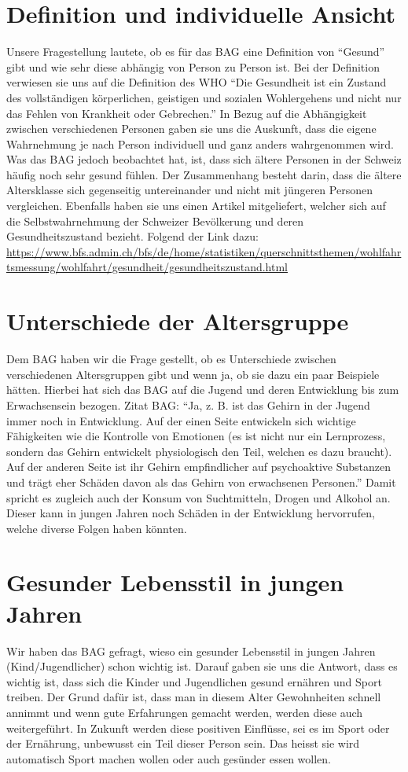 \section{Definition und individuelle Ansicht}
Unsere Fragestellung lautete, ob es für das BAG eine Definition von “Gesund” gibt und wie sehr diese abhängig von Person zu Person ist. Bei der Definition verwiesen sie uns auf die Definition des WHO “Die Gesundheit ist ein Zustand des vollständigen körperlichen, geistigen und sozialen Wohlergehens und nicht nur das Fehlen von Krankheit oder Gebrechen.” \cite{gesundheit_definition}
In Bezug auf die Abhängigkeit zwischen verschiedenen Personen gaben sie uns die Auskunft, dass die eigene Wahrnehmung je nach Person individuell und ganz anders wahrgenommen wird. Was das BAG jedoch beobachtet hat, ist, dass sich ältere Personen in der Schweiz häufig noch sehr gesund fühlen. Der Zusammenhang besteht darin, dass die ältere Altersklasse sich gegenseitig untereinander und nicht mit jüngeren Personen vergleichen. Ebenfalls haben sie uns einen Artikel mitgeliefert, welcher sich auf die Selbstwahrnehmung der Schweizer Bevölkerung und deren Gesundheitszustand bezieht. Folgend der Link dazu:
\newline
\url{https://www.bfs.admin.ch/bfs/de/home/statistiken/querschnittsthemen/wohlfahrtsmessung/wohlfahrt/gesundheit/gesundheitszustand.html}
\section{Unterschiede der Altersgruppe}
Dem BAG haben wir die Frage gestellt, ob es Unterschiede zwischen verschiedenen Altersgruppen gibt und wenn ja, ob sie dazu ein paar Beispiele hätten. Hierbei hat sich das BAG auf die Jugend und deren Entwicklung bis zum Erwachsensein bezogen. Zitat BAG: “Ja, z. B. ist das Gehirn in der Jugend immer noch in Entwicklung. Auf der einen Seite entwickeln sich wichtige Fähigkeiten wie die Kontrolle von Emotionen (es ist nicht nur ein Lernprozess, sondern das Gehirn entwickelt physiologisch den Teil, welchen es dazu braucht). Auf der anderen Seite ist ihr Gehirn empfindlicher auf psychoaktive Substanzen und trägt eher Schäden davon als das Gehirn von erwachsenen Personen.” Damit spricht es zugleich auch der Konsum von Suchtmitteln, Drogen und Alkohol an. Dieser kann in jungen Jahren noch Schäden in der Entwicklung hervorrufen, welche diverse Folgen haben könnten.
\section{Gesunder Lebensstil in jungen Jahren}
Wir haben das BAG gefragt, wieso ein gesunder Lebensstil in jungen Jahren (Kind/Jugendlicher) schon wichtig ist. Darauf gaben sie uns die Antwort, dass es wichtig ist, dass sich die Kinder und Jugendlichen gesund ernähren und Sport treiben. Der Grund dafür ist, dass man in diesem Alter Gewohnheiten schnell annimmt und wenn gute Erfahrungen gemacht werden, werden diese auch weitergeführt. In Zukunft werden diese positiven Einflüsse, sei es im Sport oder der Ernährung, unbewusst ein Teil dieser Person sein. Das heisst sie wird automatisch Sport machen wollen oder auch gesünder essen wollen.
